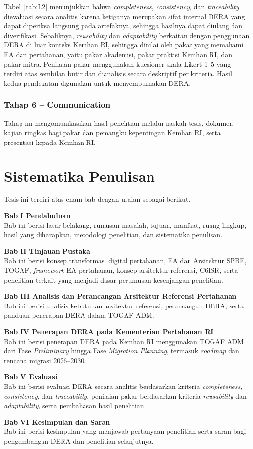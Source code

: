 Tabel~\ref{tab:I.2} menunjukkan bahwa \textit{completeness}, \textit{consistency}, dan \textit{traceability} dievaluasi secara analitis karena ketiganya merupakan sifat internal DERA yang dapat diperiksa langsung pada artefaknya, sehingga hasilnya dapat diulang dan diverifikasi. Sebaliknya, \textit{reusability} dan \textit{adaptability} berkaitan dengan penggunaan DERA di luar konteks Kemhan RI, sehingga dinilai oleh pakar yang memahami EA dan pertahanan, yaitu pakar akademisi, pakar praktisi Kemhan RI, dan pakar mitra. Penilaian pakar menggunakan kuesioner skala Likert 1–5 yang terdiri atas sembilan butir dan dianalisis secara deskriptif per kriteria. Hasil kedua pendekatan digunakan untuk menyempurnakan DERA.

\subsubsection{Tahap 6 – Communication}
\label{sec:I.7.2.6}

Tahap ini mengomunikasikan hasil penelitian melalui naskah tesis, dokumen kajian ringkas bagi pakar dan pemangku kepentingan Kemhan RI, serta presentasi kepada Kemhan RI.

\section{Sistematika Penulisan}
\label{sec:I.8}

Tesis ini terdiri atas enam bab dengan uraian sebagai berikut.

\textbf{Bab I Pendahuluan}\\
Bab ini berisi latar belakang, rumusan masalah, tujuan, manfaat, ruang lingkup, hasil yang diharapkan, metodologi penelitian, dan sistematika penulisan.

\textbf{Bab II Tinjauan Pustaka}\\
Bab ini berisi konsep transformasi digital pertahanan, EA dan Arsitektur SPBE, TOGAF, \textit{framework} EA pertahanan, konsep arsitektur referensi, C6ISR, serta penelitian terkait yang menjadi dasar perumusan kesenjangan penelitian.

\textbf{Bab III Analisis dan Perancangan Arsitektur Referensi Pertahanan}\\
Bab ini berisi analisis kebutuhan arsitektur referensi, perancangan DERA, serta panduan penerapan DERA dalam TOGAF ADM.

\textbf{Bab IV Penerapan DERA pada Kementerian Pertahanan RI}\\
Bab ini berisi penerapan DERA pada Kemhan RI menggunakan TOGAF ADM dari Fase \textit{Preliminary} hingga Fase \textit{Migration Planning}, termasuk \textit{roadmap} dan rencana migrasi 2026–2030.

\textbf{Bab V Evaluasi}\\
Bab ini berisi evaluasi DERA secara analitis berdasarkan kriteria \textit{completeness}, \textit{consistency}, dan \textit{traceability}, penilaian pakar berdasarkan kriteria \textit{reusability} dan \textit{adaptability}, serta pembahasan hasil penelitian.

\textbf{Bab VI Kesimpulan dan Saran}\\
Bab ini berisi kesimpulan yang menjawab pertanyaan penelitian serta saran bagi pengembangan DERA dan penelitian selanjutnya.
